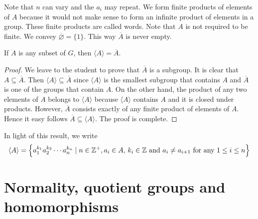 \documentclass[11pt,a4paper]{article}
\begin{document}
Note that \(n\) can vary and the \(a_i\) may repeat.
We form finite products of elements of \(A\) because it would not make sense to form an infinite product of elements in a group.
These  finite products are called words.
Note that \(A\) is not required to be finite.
We convey \(\overline{\varnothing} = \{1\}\).
This way \(\overline{A}\) is never empty.

\begin{prop}
    If \(A\) is any subset of \(G\), then 
    \(\langle A\rangle = \overline{A}\).
\end{prop}

\begin{proof}
    We leave to the student to prove that \(\overline{A}\)  is a subgroup.
    It is clear that  \(A\subseteq \overline{A}\).
    Then  \(\langle A\rangle \subseteq \overline{A}\) since  \(\langle A\rangle\) is the smallest subgroup that contains \(A\) and \(\overline{A}\) is one of the  groups that contain \(A\).
    On the other hand, the product of any two elements of \(A\) belongs to \(\langle A\rangle\) because \(\langle A\rangle\) contains  \(A\) and it is closed under products.
    However, \(\overline{A}\) consists exactly of any finite product of elements of \(A\).
    Hence it easy follows \(\overline{A}\subseteq \langle A\rangle\).
    The proof is complete.
\end{proof}


\begin{rem}In light of this result, we write 
\[\langle A \rangle = \left\{ a_1^{k_1} a_2^{k_2} \cdots a_{n}^{k_n} \mid n\in \mathbb{Z}^+, a_i \in A ,\, k_i \in \mathbb{Z} \text{ and } a_i\neq a_{i+1} \text{ for any } 1 \leq i\leq  n \right\}\]

    
\end{rem}

\section{Normality, quotient groups and homomorphisms}
\end{document}
